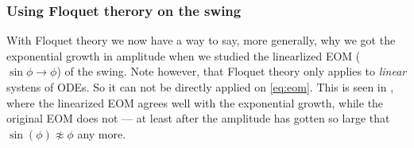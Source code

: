 \subsubsection*{Using Floquet therory on the swing}
With Floquet theory we now have a way to say, more generally, why
we got the exponential growth in amplitude when we studied the
linearlized EOM ($\sin\phi\to\phi$) of the swing. Note however, that
Floquet theory only applies to \emph{linear} systens of ODEs. So
it can not be directly applied on \eqref{eq:eom}. This is seen in
, where the linearized EOM agrees well with the
exponential growth, while the original EOM does not --- at least after
the amplitude has gotten so large that $\sin(\phi)\not\approx\phi$ any
more. 


